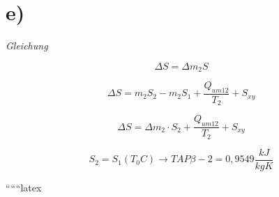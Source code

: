 

\section*{e)}

\textit{Gleichung}

\[
\Delta S = \Delta m_2 S
\]

\[
\Delta S = m_2 S_2 - m_2 S_1 + \frac{Q_{um12}}{T_2} + S_{xy}
\]

\[
\Delta S = \Delta m_2 \cdot S_2 + \frac{Q_{um12}}{T_2} + S_{xy}
\]

\[
S_2 = S_1 (T_0 C) \rightarrow TAP \beta - 2 = 0,9549 \frac{kJ}{kgK}
\]

``````latex